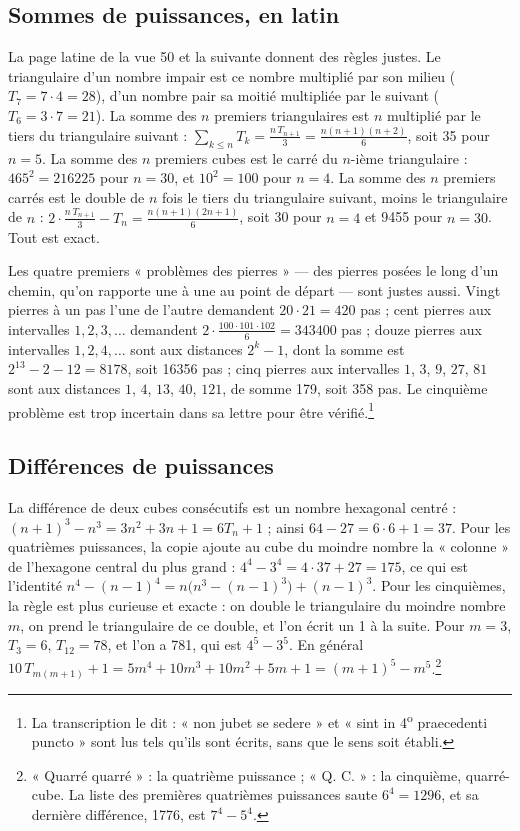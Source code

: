 \documentclass[11pt,a4paper]{article}
\begin{document}
\subsection*{Sommes de puissances, en latin}

La page latine de la vue 50 et la suivante donnent des règles justes. Le
triangulaire d'un nombre impair est ce nombre multiplié par son milieu
($T_7 = 7 \cdot 4 = 28$), d'un nombre pair sa moitié multipliée par le suivant
($T_6 = 3 \cdot 7 = 21$). La somme des $n$ premiers triangulaires est $n$
multiplié par le tiers du triangulaire suivant : $\sum_{k \le n} T_k =
\frac{n\,T_{n+1}}{3} = \frac{n(n+1)(n+2)}{6}$, soit 35 pour $n = 5$. La somme
des $n$ premiers cubes est le carré du $n$-ième triangulaire : $465^2 = 216225$
pour $n = 30$, et $10^2 = 100$ pour $n = 4$. La somme des $n$ premiers carrés est
le double de $n$ fois le tiers du triangulaire suivant, moins le triangulaire de
$n$ : $2 \cdot \frac{n\,T_{n+1}}{3} - T_n = \frac{n(n+1)(2n+1)}{6}$, soit 30 pour
$n = 4$ et 9455 pour $n = 30$. Tout est exact.

Les quatre premiers « problèmes des pierres » — des pierres posées le long d'un
chemin, qu'on rapporte une à une au point de départ — sont justes aussi. Vingt
pierres à un pas l'une de l'autre demandent $20 \cdot 21 = 420$ pas ; cent
pierres aux intervalles $1, 2, 3, \dots$ demandent $2 \cdot \frac{100 \cdot 101
\cdot 102}{6} = 343400$ pas ; douze pierres aux intervalles $1, 2, 4, \dots$
sont aux distances $2^k - 1$, dont la somme est $2^{13} - 2 - 12 = 8178$, soit
16356 pas ; cinq pierres aux intervalles $1$, $3$, $9$, $27$, $81$ sont aux distances
$1$, $4$, $13$, $40$, $121$, de somme 179, soit 358 pas. Le cinquième problème est trop
incertain dans sa lettre pour être vérifié.\footnote{La transcription le dit :
« non jubet se sedere » et « sint in 4\textsuperscript{o} praecedenti puncto »
sont lus tels qu'ils sont écrits, sans que le sens soit établi.}

\subsection*{Différences de puissances}

La différence de deux cubes consécutifs est un nombre hexagonal centré :
$(n+1)^3 - n^3 = 3n^2 + 3n + 1 = 6T_n + 1$ ; ainsi $64 - 27 = 6 \cdot 6 + 1 = 37$.
Pour les quatrièmes puissances, la copie ajoute au cube du moindre nombre la
« colonne » de l'hexagone central du plus grand : $4^4 - 3^4 = 4 \cdot 37 + 27
= 175$, ce qui est l'identité $n^4 - (n-1)^4 = n\bigl(n^3 - (n-1)^3\bigr) +
(n-1)^3$. Pour les cinquièmes, la règle est plus curieuse et exacte : on double le
triangulaire du moindre nombre $m$, on prend le triangulaire de ce double, et
l'on écrit un 1 à la suite. Pour $m = 3$, $T_3 = 6$, $T_{12} = 78$, et l'on a
781, qui est $4^5 - 3^5$. En général $10\,T_{m(m+1)} + 1 = 5m^4 + 10m^3 + 10m^2 +
5m + 1 = (m+1)^5 - m^5$.\footnote{« Quarré quarré » : la quatrième puissance ;
« Q. C. » : la cinquième, quarré-cube. La liste des premières quatrièmes
puissances saute $6^4 = 1296$, et sa dernière différence, 1776, est
$7^4 - 5^4$.}
\end{document}
